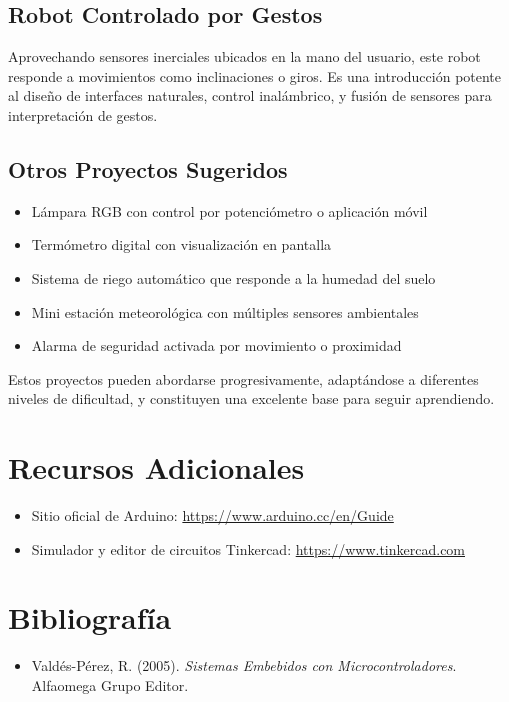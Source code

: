 \documentclass[a4paper,11pt]{article}
\begin{document}
\subsection{Robot Controlado por Gestos}
Aprovechando sensores inerciales ubicados en la mano del usuario, este robot responde a movimientos como inclinaciones o giros. Es una introducción potente al diseño de interfaces naturales, control inalámbrico, y fusión de sensores para interpretación de gestos.

\subsection{Otros Proyectos Sugeridos}
\begin{itemize}
  \item Lámpara RGB con control por potenciómetro o aplicación móvil
  \item Termómetro digital con visualización en pantalla
  \item Sistema de riego automático que responde a la humedad del suelo
  \item Mini estación meteorológica con múltiples sensores ambientales
  \item Alarma de seguridad activada por movimiento o proximidad
\end{itemize}

Estos proyectos pueden abordarse progresivamente, adaptándose a diferentes niveles de dificultad, y constituyen una excelente base para seguir aprendiendo.

\section*{Recursos Adicionales}
\begin{itemize}
  \item Sitio oficial de Arduino: \url{https://www.arduino.cc/en/Guide}
  \item Simulador y editor de circuitos Tinkercad: \url{https://www.tinkercad.com}
  
\end{itemize}

\section*{Bibliografía }
\begin{itemize}
  \item Valdés-Pérez, R. (2005). \textit{Sistemas Embebidos con Microcontroladores}. Alfaomega Grupo Editor.
\end{itemize}
\end{document}
